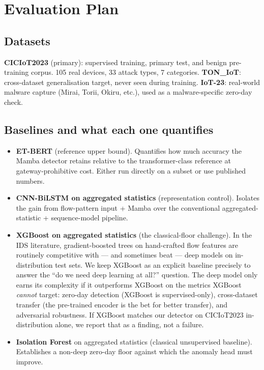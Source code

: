 \documentclass[11pt,a4paper]{article}
\begin{document}
\section{Evaluation Plan}

\subsection{Datasets}
\textbf{CICIoT2023} (primary): supervised training, primary test, and benign pre-training corpus. 105 real devices, 33 attack types, 7 categories. \textbf{TON\_IoT}: cross-dataset generalisation target, never seen during training. \textbf{IoT-23}: real-world malware capture (Mirai, Torii, Okiru, etc.), used as a malware-specific zero-day check.

\subsection{Baselines and what each one quantifies}
\begin{itemize}[leftmargin=*, itemsep=2pt]
  \item \textbf{ET-BERT} (reference upper bound). Quantifies how much accuracy the Mamba detector retains relative to the transformer-class reference at gateway-prohibitive cost. Either run directly on a subset or use published numbers.
  \item \textbf{CNN-BiLSTM on aggregated statistics} (representation control). Isolates the gain from flow-pattern input + Mamba over the conventional aggregated-statistic + sequence-model pipeline.
  \item \textbf{XGBoost on aggregated statistics} (the classical-floor challenge). In the IDS literature, gradient-boosted trees on hand-crafted flow features are routinely competitive with --- and sometimes beat --- deep models on in-distribution test sets. We keep XGBoost as an explicit baseline precisely to answer the ``do we need deep learning at all?'' question. The deep model only earns its complexity if it outperforms XGBoost on the metrics XGBoost \emph{cannot} target: zero-day detection (XGBoost is supervised-only), cross-dataset transfer (the pre-trained encoder is the bet for better transfer), and adversarial robustness. If XGBoost matches our detector on CICIoT2023 in-distribution alone, we report that as a finding, not a failure.
  \item \textbf{Isolation Forest} on aggregated statistics (classical unsupervised baseline). Establishes a non-deep zero-day floor against which the anomaly head must improve.
\end{itemize}
\end{document}
